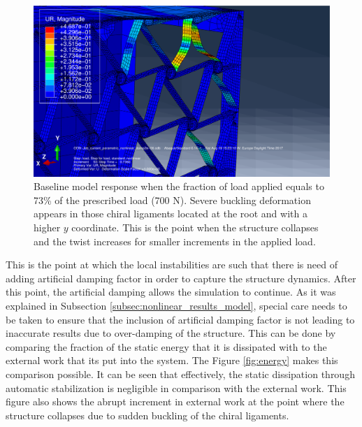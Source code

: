   \begin{figure}[!htpb] %
    \centering
    \includegraphics[width=0.8 \textwidth]{figures/../figures/result-sim/2-UR}
    \caption[Baseline model response when the fraction of load applied equals to 73\% of the prescribed load (700 N)]{Baseline model response when the fraction of load applied equals to 73\% of the prescribed load (700 N). Severe buckling deformation appears in those chiral ligaments located at the root and with a higher $y$ coordinate. This is the point when the structure collapses and the twist increases for smaller increments in the applied load.}\label{fig:2-UR}
  \end{figure}

  This is the point at which the local instabilities are such that there is need of adding artificial damping factor in order to capture the structure dynamics. After this point, the artificial damping allows the simulation to continue. As it was explained in Subsection \ref{subsec:nonlinear_results_model}, special care needs to be taken to ensure that the inclusion of artificial damping factor is not leading to inaccurate results due to over-damping of the structure. This can be done by comparing the fraction of the static energy that it is dissipated with to the external work that its put into the system. The Figure \ref{fig:energy} makes this comparison possible. It can be seen that effectively, the static dissipation through automatic stabilization is negligible in comparison with the external work. This figure also shows the abrupt increment in external work at the point where the structure collapses due to sudden buckling of the chiral ligaments.

